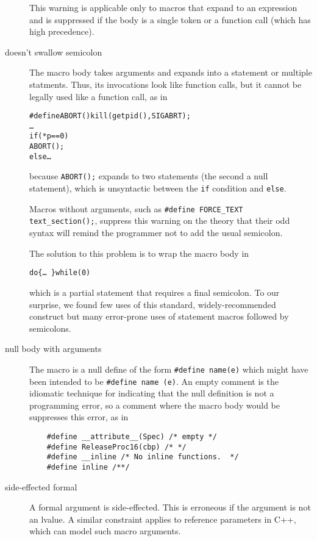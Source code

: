 \begin{description}
        This warning is applicable only to macros that expand to an
        expression and is suppressed if the body is a single token or a
        function call (which has high precedence).

\item[doesn't swallow semicolon]\label{item:swallow-semicolon}
        The macro body takes arguments and expands into a statement or
        multiple statments.  Thus, its invocations look like function
        calls, but it cannot be legally used like a function call, as in
\begin{alltt}
    #define ABORT() kill(getpid(),SIGABRT);
    \ldots
    if (*p == 0)
      ABORT();
    else \ldots
\end{alltt}
        because {\tt ABORT();} expands to two statements (the second a null
        statement), which is unsyntactic between the {\tt if} condition and
        {\tt else}.

        Macros without arguments, such as {\tt \#define \verb|FORCE_TEXT|
        \verb|text_section|();}, suppress this warning on the theory that their
        odd syntax will remind the programmer not to add the usual semicolon.

        The solution to this problem is to wrap the macro body in
\begin{alltt}
             do \verb|{| \ldots\ \verb|}| while (0)
\end{alltt}
        which is a partial statement that requires a final semicolon.  To
        our surprise, we found few uses of this standard, widely-recommended
        construct but many error-prone uses of statement macros followed by
        semicolons.

\item[null body with arguments]
        The macro is a null define of the form {\tt \#define name(e)} 
        which might have been intended to be {\tt \#define name (e)}.
        An empty comment is the idiomatic technique for indicating that the
        null definition is not a programming error, so a comment where the macro
        body would be suppresses this error, as in
\begin{verbatim}
    #define __attribute__(Spec) /* empty */
    #define ReleaseProc16(cbp) /* */
    #define __inline /* No inline functions.  */
    #define inline /**/
\end{verbatim}

\item[side-effected formal]
        A formal argument is side-effected.  This is erroneous if the
        argument is not an lvalue.  A similar constraint applies to
        reference parameters in C++, which can model such macro arguments.


\end{description}
